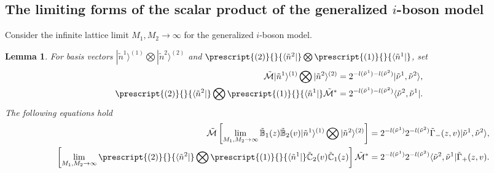 \documentclass[11pt,reqno]{amsart}
\numberwithin{equation}{section}
\newtheorem{lemma}[theorem]{Lemma}
\begin{document}
	\subsection{The limiting forms of the scalar product of the   generalized $i$-boson model}
	Consider the infinite lattice limit $M_{1},M_{2} \to \infty$ for the   generalized $i$-boson model.
	\begin{lemma}\label{M-wq-n}
		For basis vectors $|\tilde{n}^{1}\rangle^{(1)}\bigotimes|\tilde{n}^{2}\rangle^{(2)}$ and $	 \prescript{(2)}{}{\langle \tilde{n}^{2}|}\bigotimes \prescript{(1)}{}{\langle \tilde{n}^{1}|} $,
		set
		\begin{align}
			\tilde{\mathcal{M}}  | \tilde{n}^{1}\rangle^{(1)}\bigotimes|\tilde{n}^{2}\rangle^{(2)}&=
			2^{-l(\tilde{\nu}^{1})-l(\tilde{\nu}^{2})}	
			| \tilde{\nu}^{1},\tilde{\nu}^{2} \rangle, \\	
			\prescript{(2)}{}{\langle \tilde{n}^{2}|}\bigotimes \prescript{(1)}{}{\langle \tilde{n}^{1}|}  \tilde{\mathcal{M}}^* &=
			2^{-l(\tilde{\nu}^{1})-l(\tilde{\nu}^{2})}	
			\langle \tilde{\nu}^{2},\tilde{\nu}^{1}|.
		\end{align}	
		The following equations hold
		\begin{align}
			\tilde{\mathcal{M}} \left[ \lim_{M_{1},M_{2} \to \infty} \tilde{\mathbb{B}}_{1}(z) \tilde{\mathbb{B}}_{2}(v)|\tilde{n}^{1}\rangle^{(1)}\bigotimes|\tilde{n}^{2}\rangle^{(2)}\right] &=
			2^{- l(\tilde{\nu}^{1})}	2^{- l(\tilde{\nu}^{2})}	
			\tilde{\Gamma}_-(z,v) | \tilde{\nu}^1,\tilde{\nu}^2 \rangle, \\
			\quad \left[ \lim_{M_{1},M_{2}  \to \infty}
			\prescript{(2)}{}{\langle \tilde{n}^{2}|}\bigotimes \prescript{(1)}{}{\langle \tilde{n}^{1}|}  \tilde{\mathbb{C}}_{2}(v)\tilde{\mathbb{C}}_{1}(z) \right] \tilde{\mathcal{M}}^* &=
			2^{- l(\tilde{\nu}^{1})}	2^{- l(\tilde{\nu}^{2})}	
			\langle \tilde{\nu}^2,\tilde{\nu}^1| \tilde{\Gamma}_+(z,v).
		\end{align}
	\end{lemma}
\end{document}
